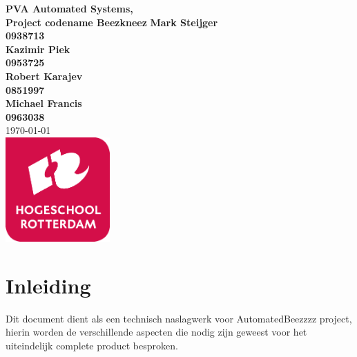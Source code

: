 \documentclass{article}
\begin{document}
\sffamily
\begin{titlepage}
  \centering
    \vfill
    {\bfseries\Huge
      PVA Automated Systems, \\
      Project codename Beezkneez
        \vskip2cm
      }
      {\bfseries\Large
        Mark Steijger\\
      }
      {
        \bfseries\normalsize
        0938713\\
            \vskip1cm
    }
          {\bfseries\Large
        Kazimir Piek\\
      }
      {
        \bfseries\normalsize
        0953725\\
            \vskip1cm
    }      {\bfseries\Large
        Robert Karajev\\
      }
      {
        \bfseries\normalsize
        0851997\\
            \vskip1cm
    }      {\bfseries\Large
        Michael Francis\\
      }
      {
        \bfseries\normalsize
        0963038\\
            \vskip1cm
    }
            \vskip1cm
        \today\\
    \vfill
    \includegraphics[width=4cm]{../IMAGES/logohr.png} %
    \vfill
    \vfill
\end{titlepage}
\newpage
\tableofcontents

\newpage
\section{Inleiding}
Dit document dient als een technisch naslagwerk voor AutomatedBeezzzz project, hierin worden de verschillende aspecten
die nodig zijn geweest voor het uiteindelijk complete product besproken.



% 

% 



\end{document}
